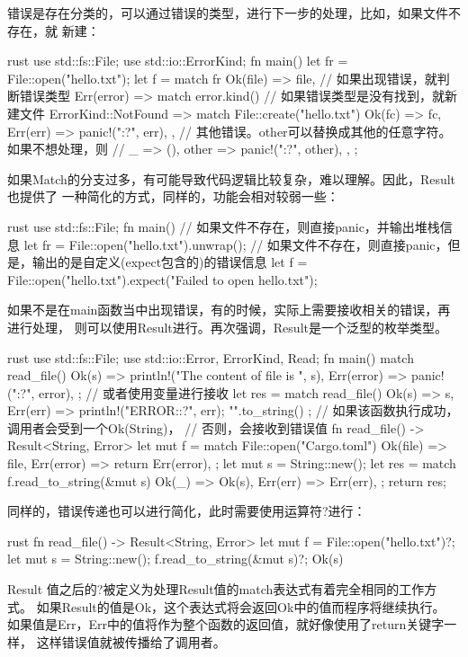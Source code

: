 错误是存在分类的，可以通过错误的类型，进行下一步的处理，比如，如果文件不存在，就
新建：
\begin{code-block}{rust}
use std::fs::File;
use std::io::ErrorKind;
fn main() {
    let fr = File::open("hello.txt");
    let f = match fr {
        Ok(file) => file,
        // 如果出现错误，就判断错误类型
        Err(error) => match error.kind() {
            // 如果错误类型是没有找到，就新建文件
            ErrorKind::NotFound => match File::create("hello.txt") {
                Ok(fc) => fc,
                Err(err) => panic!("{:?}", err),
            },
            // 其他错误。other可以替换成其他的任意字符。如果不想处理，则
            // _ => (),
            other => panic!("{:?}", other),
        },
    };
}
\end{code-block}

如果Match的分支过多，有可能导致代码逻辑比较复杂，难以理解。因此，Result也提供了
一种简化的方式，同样的，功能会相对较弱一些：
\begin{code-block}{rust}
use std::fs::File;
fn main() {
    // 如果文件不存在，则直接panic，并输出堆栈信息
    let fr = File::open("hello.txt").unwrap();
    // 如果文件不存在，则直接panic，但是，输出的是自定义(expect包含的)的错误信息
    let f = File::open("hello.txt").expect("Failed to open hello.txt");
}
\end{code-block}

如果不是在main函数当中出现错误，有的时候，实际上需要接收相关的错误，再进行处理，
则可以使用Result进行。再次强调，Result是一个泛型的枚举类型。
\begin{code-block}{rust}
use std::fs::File;
use std::io::{Error, ErrorKind, Read};
fn main() {
    match read_file() {
       Ok(s) => println!("The content of file is {}", s),
       Err(error) => panic!("{:?}", error),
    };
    // 或者使用变量进行接收
    let res = match read_file() {
        Ok(s) => s,
        Err(err) => {
            println!("ERROR:{:?}", err);
            "".to_string()
        }
    };
}
// 如果该函数执行成功，调用者会受到一个Ok(String)，
// 否则，会接收到错误值
fn read_file() -> Result<String, Error> {
    let mut f = match File::open("Cargo.toml") {
        Ok(file) => file,
        Err(error) => return Err(error),
    };
    let mut s = String::new();
    let res = match f.read_to_string(&mut s) {
        Ok(_) => Ok(s),
        Err(err) => Err(err),
    };
    return res;
}
\end{code-block}

同样的，错误传递也可以进行简化，此时需要使用运算符?进行：
\begin{code-block}{rust}
fn read_file() -> Result<String, Error> {
    let mut f = File::open("hello.txt")?;
    let mut s = String::new();
    f.read_to_string(&mut s)?;
    Ok(s)
}
\end{code-block}
Result 值之后的?被定义为处理Result值的match表达式有着完全相同的工作方式。
如果Result的值是Ok，这个表达式将会返回Ok中的值而程序将继续执行。
如果值是Err，Err中的值将作为整个函数的返回值，就好像使用了return关键字一样，
这样错误值就被传播给了调用者。

